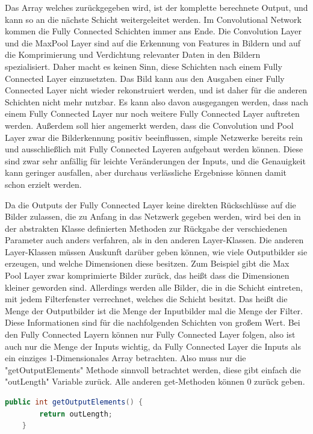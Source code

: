 \documentclass[12pt]{article}
\begin{document}
Das Array welches zurückgegeben wird, ist der komplette berechnete Output, und kann so an die nächste Schicht weitergeleitet werden. Im Convolutional Network kommen die Fully Connected Schichten immer ans Ende. Die Convolution Layer und die MaxPool Layer sind auf die Erkennung von Features in Bildern und auf die Komprimierung und Verdichtung relevanter Daten in den Bildern spezialisiert. Daher macht es keinen Sinn, diese Schichten nach einem Fully Connected Layer einzusetzten. Das Bild kann aus den Ausgaben einer Fully Connected Layer nicht wieder rekonstruiert werden, und ist daher für die anderen Schichten nicht mehr nutzbar. Es kann also davon ausgegangen werden, dass nach einem Fully Connected Layer nur noch weitere Fully Connected Layer auftreten werden. 
Außerdem soll hier angemerkt werden, dass die Convolution und Pool Layer zwar die Bilderkennung positiv beeinflussen, simple Netzwerke bereits rein und ausschließlich mit Fully Connected Layeren aufgebaut werden können. Diese sind zwar sehr anfällig für leichte Veränderungen der Inputs, und die Genauigkeit kann geringer ausfallen, aber durchaus verlässliche Ergebnisse können damit schon erzielt werden.

Da die Outputs der Fully Connected Layer keine direkten Rückschlüsse auf die Bilder zulassen, die zu Anfang in das Netzwerk gegeben werden, wird bei den in der abstrakten Klasse definierten Methoden zur Rückgabe der verschiedenen Parameter auch anders verfahren, als in den anderen Layer-Klassen. Die anderen Layer-Klassen müssen Auskunft darüber geben können, wie viele Outputbilder sie erzeugen, und welche Dimensionen diese besitzen. Zum Beispiel gibt die Max Pool Layer zwar komprimierte Bilder zurück, das heißt dass die Dimensionen kleiner geworden sind. Allerdings werden alle Bilder, die in die Schicht eintreten, mit jedem Filterfenster verrechnet, welches die Schicht besitzt. Das heißt die Menge der Outputbilder ist die Menge der Inputbilder mal die Menge der Filter. Diese Informationen sind für die nachfolgenden Schichten von großem Wert. Bei den Fully Connected Layern können nur Fully Connected Layer folgen, also ist auch nur die Menge der Inputs wichtig, da Fully Connected Layer die Inputs als ein einziges 1-Dimensionales Array betrachten. Also muss nur die "getOutputElements" Methode sinnvoll betrachtet werden, diese gibt einfach die "outLength" Variable zurück. Alle anderen get-Methoden können 0 zurück geben.

\begin{lstlisting}[language=Java] 
    public int getOutputElements() {
        return outLength;
    }
\end{lstlisting} 
\clearpage
\end{document}

